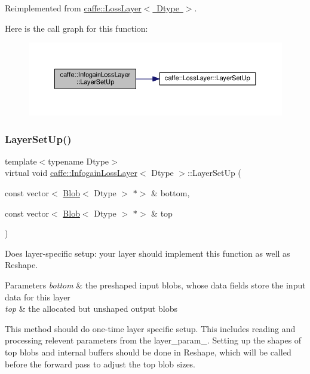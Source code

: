 Reimplemented from \mbox{\hyperlink{classcaffe_1_1_loss_layer_aa6fc7c2e90be66f1c1f0683637c949da}{caffe\+::\+Loss\+Layer$<$ Dtype $>$}}.

Here is the call graph for this function\+:
\nopagebreak
\begin{figure}[H]
\begin{center}
\leavevmode
\includegraphics[width=350pt]{classcaffe_1_1_infogain_loss_layer_a772be3f4074c72b3cf9214bda3422402_cgraph}
\end{center}
\end{figure}
\mbox{\label{classcaffe_1_1_infogain_loss_layer_ae59c01de80f22c87c1dd2ef87c6e6a2f}} 
\subsubsection{\texorpdfstring{Layer\+Set\+Up()}{LayerSetUp()}\hspace{0.1cm}{\footnotesize\ttfamily [2/2]}}
{\footnotesize\ttfamily template$<$typename Dtype$>$ \\
virtual void \mbox{\hyperlink{classcaffe_1_1_infogain_loss_layer}{caffe\+::\+Infogain\+Loss\+Layer}}$<$ Dtype $>$\+::Layer\+Set\+Up (\begin{DoxyParamCaption}\item[{const vector$<$ \mbox{\hyperlink{classcaffe_1_1_blob}{Blob}}$<$ Dtype $>$ $\ast$$>$ \&}]{bottom,  }\item[{const vector$<$ \mbox{\hyperlink{classcaffe_1_1_blob}{Blob}}$<$ Dtype $>$ $\ast$$>$ \&}]{top }\end{DoxyParamCaption})\hspace{0.3cm}{\ttfamily [virtual]}}



Does layer-\/specific setup\+: your layer should implement this function as well as Reshape. 


\begin{DoxyParams}{Parameters}
{\em bottom} & the preshaped input blobs, whose data fields store the input data for this layer \\
\hline
{\em top} & the allocated but unshaped output blobs\\
\hline
\end{DoxyParams}
This method should do one-\/time layer specific setup. This includes reading and processing relevent parameters from the {\ttfamily layer\+\_\+param\+\_\+}. Setting up the shapes of top blobs and internal buffers should be done in {\ttfamily Reshape}, which will be called before the forward pass to adjust the top blob sizes. 

